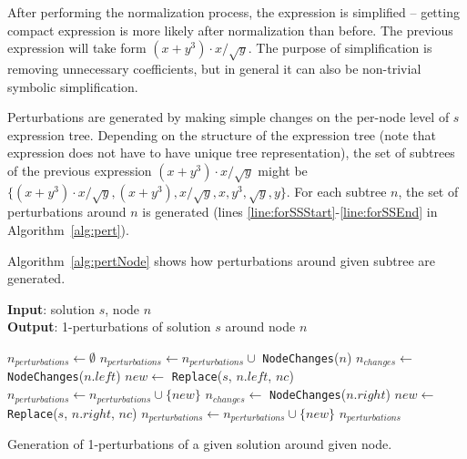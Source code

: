\documentclass[a4paper,12pt]{elsarticle}
\begin{document}
After performing the normalization process, the expression is simplified -- getting compact expression is more likely after normalization than before. The previous expression will take form $(x+y^3)\cdot x/\sqrt{y}$. The purpose of simplification is removing unnecessary coefficients, but in general it can also be non-trivial symbolic simplification. 


Perturbations are generated by making simple changes on the per-node level of $s$ expression tree.
Depending on the structure of the expression tree (note that expression does not have to have unique tree representation), the set of subtrees of the previous expression $(x+y^3)\cdot x/\sqrt{y}$ might be $\{(x+y^3)\cdot x/\sqrt{y}, (x+y^3), x/\sqrt{y}, x, y^3, \sqrt{y}, y\}$. %
For each subtree $n$, the set of perturbations around $n$ is generated (lines \ref{line:forSSStart}-\ref{line:forSSEnd} in Algorithm~\ref{alg:pert}).   


Algorithm~\ref{alg:pertNode} shows how perturbations around given subtree are generated.

\begin{algorithm}	
	\hspace*{\algorithmicindent} \textbf{Input}: solution $s$, node $n$\\
	\hspace*{\algorithmicindent} \textbf{Output}: 1-perturbations of solution $s$ around node $n$
	\begin{algorithmic}[1]
		\State $n_{perturbations} \gets \emptyset$
		 \label{alg:alg4-case-1}
		\State $n_{perturbations} \gets n_{perturbations} \cup$ \texttt{NodeChanges}($n$)
		\EndIf
		\label{alg:alg4-case-2}
		\State $n_{changes} \gets$ \texttt{NodeChanges}($n.left$)
		\State $new \gets$ \texttt{Replace}($s$, $n.left$, $nc$)
		\State $n_{perturbations} \gets n_{perturbations} \cup \{new\}$
		\EndFor
		\EndIf
		\label{alg:alg4-case-3}
		\State $n_{changes} \gets$ \texttt{NodeChanges}($n.right$)
		\State $new \gets$ \texttt{Replace}($s$, $n.right$, $nc$)
		\State $n_{perturbations} \gets n_{perturbations} \cup \{new\}$
		\EndFor
		\EndIf
		\State \Return $n_{perturbations}$
		\EndProcedure
	\end{algorithmic}
	\caption{Generation of 1-perturbations of a given solution around given node.}
	\label{alg:pertNode}
\end{algorithm}
\end{document}
